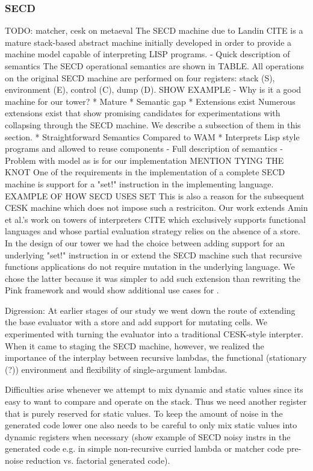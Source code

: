 \documentclass[fleqn]{article}
\theoremstyle{definition}
\begin{document}
\subsubsection{SECD}
TODO: matcher, cesk on metaeval
The SECD machine due to Landin CITE is a mature stack-based abstract machine initially developed in order to provide a machine model capable of interpreting LISP programs. 
- Quick description of semantics
The SECD operational semantics are shown in TABLE. All operations on the original SECD machine are performed on four registers: stack (S), environment (E), control (C), dump (D). SHOW EXAMPLE
- Why is it a good machine for our tower?
	* Mature
	* Semantic gap
	* Extensions exist
Numerous extensions exist that show promising candidates for experimentations with collapsing through the SECD machine. We describe a subsection of them in this section.
	* Straightforward Semantics Compared to WAM
	* Interprets Lisp style programs and allowed to reuse components
- Full description of semantics
- Problem with model as is for our implementation
MENTION TYING THE KNOT One of the requirements in the implementation of a complete SECD machine is support for a "set!" instruction in the implementing language. EXAMPLE OF HOW SECD USES SET This is also a reason for the subsequent CESK machine which does not impose such a restriciton. Our work extends Amin et al.'s work on towers of interpreters CITE which exclusively supports functional languages and whose partial evaluation strategy relies on the absence of a store. In the design of our tower we had the choice between adding support for an underlying "set!" instruction in \mslang or extend the SECD machine such that recursive functions applications do not require mutation in the underlying language. We chose the latter because it was simpler to add such extension than rewriting the Pink framework and would show additional use cases for \mslang.

Digression:
At earlier stages of our study we went down the route of extending the base evaluator with a store and add support for mutating cells. We experimented with turning the evaluator into a traditional CESK-style interpter. When it came to staging the SECD machine, however, we realized the importance of the interplay between recursive lambdas, the functional (stationary (?)) environment and flexibility of single-argument lambdas.

Difficulties arise whenever we attempt to mix dynamic and static values since its easy to want to compare and operate on the stack. Thus we need another register that is purely reserved for static values. To keep the amount of noise in the generated code lower one also needs to be careful to only mix static values into dynamic registers when necessary (show example of SECD noisy instrs in the generated code e.g. in simple non-recursive curried lambda or matcher code pre-noise reduction vs. factorial generated code).
\end{document}
